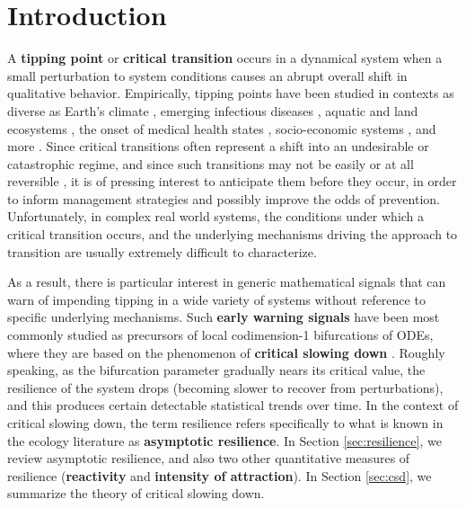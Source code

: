 
\section{Introduction}
\label{sec:intro}

A \textbf{tipping point} or \textbf{critical transition} occurs in a dynamical system when a small perturbation to system conditions causes an abrupt overall shift in qualitative behavior. 
%
Empirically, tipping points have been studied in contexts as diverse as
Earth's climate \cite{lentonTippingElementsEarth2008, dakosSlowingEarlyWarning2008a}, 
emerging infectious diseases \cite{brettDynamicalFootprintsEnable2020}, 
aquatic and land ecosystems \cite{schefferCatastrophicShiftsEcosystems2001a, carpenterRisingVarianceLeading2006}, 
the onset of medical health states \cite{mcsharryPredictionEpilepticSeizures2003, venegasSelforganizedPatchinessAsthma2005}, 
socio-economic systems \cite{ginkelClimateChangeInduced2020}, 
and more \cite{georgeEarlyWarningSignals2021, schefferEarlywarningSignalsCritical2009a, boettigerEarlyWarningSignals2013}. 
%
Since critical transitions often represent a shift into an undesirable or catastrophic regime, and since such transitions may not be easily or at all reversible \cite{albrichClimateChangeCauses2020, chenImperfectVaccineHysteresis2019, lucariniThermodynamicAnalysisSnowball2010}, it is of pressing interest to anticipate them before they occur, in order to inform management strategies and possibly improve the odds of prevention. Unfortunately, in complex real world systems, the conditions under which a critical transition occurs, and the underlying mechanisms driving the approach to transition are usually extremely difficult to characterize.

As a result, there is particular interest in generic mathematical signals that can warn of impending tipping in a wide variety of systems without reference to specific underlying mechanisms. Such \textbf{early warning signals} have been most commonly studied as precursors of local codimension-1 bifurcations of ODEs, where they are based on the phenomenon of \textbf{critical slowing down} \cite{schefferEarlywarningSignalsCritical2009a}. Roughly speaking, as the bifurcation parameter gradually nears its critical value, the resilience of the system drops (becoming slower to recover from perturbations), and this produces certain detectable statistical trends over time. In the context of critical slowing down, the term resilience refers specifically to what is known in the ecology literature as \textbf{asymptotic resilience}. In Section \ref{sec:resilience}, we review asymptotic resilience, and also two other quantitative measures of resilience (\textbf{reactivity} and \textbf{intensity of attraction}). In Section \ref{sec:csd}, we summarize the theory of critical slowing down. 

